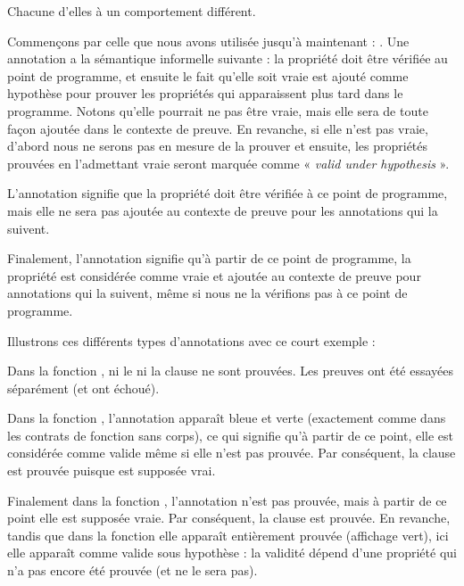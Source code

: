 Chacune d'elles à un comportement différent.


Commençons par celle que nous avons utilisée jusqu'à maintenant :
. Une annotation  a la sémantique
informelle suivante : la propriété  doit être vérifiée au point
de programme, et ensuite le fait qu'elle soit vraie est ajouté comme hypothèse
pour prouver les propriétés qui apparaissent plus tard dans le programme. Notons
qu'elle pourrait ne pas être vraie, mais elle sera de toute façon ajoutée dans
le contexte de preuve. En revanche, si elle n'est pas vraie, d'abord nous ne
serons pas en mesure de la prouver et ensuite, les propriétés prouvées en
l'admettant vraie seront marquée comme « \textit{valid under hypothesis} ».


L'annotation  signifie que la propriété  doit
être vérifiée à ce point de programme, mais elle ne sera pas ajoutée au contexte
de preuve pour les annotations qui la suivent.


Finalement, l'annotation  signifie qu'à partir de ce point
de programme, la propriété  est considérée comme vraie et ajoutée
au contexte de preuve pour annotations qui la suivent, même si nous ne la
vérifions pas à ce point de programme.


Illustrons ces différents types d'annotations avec ce court exemple :






Dans la fonction , ni le  ni la
clause  ne sont prouvées. Les preuves ont été essayées
séparément (et ont échoué).


Dans la fonction , l'annotation 
apparaît bleue et verte (exactement comme dans les contrats de fonction sans
corps), ce qui signifie qu'à partir de ce point, elle est considérée comme
valide même si elle n'est pas prouvée. Par conséquent, la clause
 est prouvée puisque  est
supposée vrai.


Finalement dans la fonction , l'annotation
 n'est pas prouvée, mais à partir de ce point elle est
supposée vraie. Par conséquent, la clause  est prouvée.
En revanche, tandis que dans la fonction  elle
apparaît entièrement prouvée (affichage vert), ici elle apparaît comme valide
sous hypothèse : la validité dépend d'une propriété qui n'a pas encore été
prouvée (et ne le sera pas).


